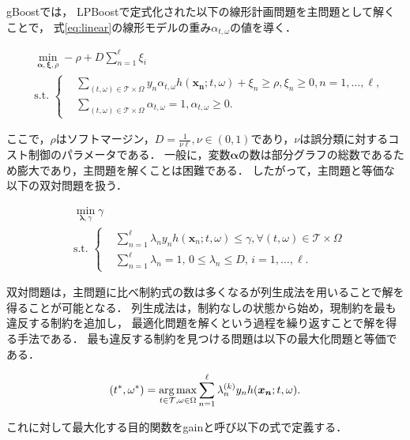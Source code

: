 gBoostでは，
LPBoostで定式化された以下の線形計画問題を主問題として解くことで，
式\eqref{eq:linear}の線形モデルの重み$\alpha_{t,\omega}$の値を導く．

\begin{align}
	&\min_{\bm{\alpha},\bm{\xi},\rho} -\rho + D \sum_{n=1}^{\ell} \xi_{i} \nonumber\\
	&\text{s.t.} \,\,\left\{
	\begin{aligned}
		&\sum_{(t,\omega) \in \mathcal{T} \times \Omega} y_{n} \alpha_{t,\omega} h(\bm{x_{n}};t,\omega) + \xi_{n} \geq \rho,
		\xi_{n} \geq 0,	n = 1, \dots , \ell,\nonumber \\
		&\sum_{(t,\omega) \in \mathcal{T} \times \Omega} \alpha_{t, \omega} = 1, \alpha_{t, \omega} \geq 0.
	\end{aligned}\right.
\end{align}

ここで，$\rho$はソフトマージン，$D=\frac{1}{\nu \ell}, \nu \in (0,1)$であり，$\nu$は誤分類に対するコスト制御のパラメータである．
一般に，変数$\bm{\alpha}$の数は部分グラフの総数であるため膨大であり，主問題を解くことは困難である．
したがって，主問題と等価な以下の双対問題を扱う．

\begin{align}
	\label{eq:dualprob}
	&\min_{\bm{\lambda},\gamma} \gamma \nonumber\\
	&\text{s.t.} \,\,\left\{
	\begin{aligned}
		& \sum_{n=1}^{\ell} \lambda_{n} y_{n} h(\bm{x}_{n};t,\omega) \leq \gamma,
		\forall(t,\omega) \in \mathcal{T} \times \Omega\\
		& \sum_{n=1}^{\ell} \lambda_{n} = 1, \,0 \leq \lambda_{n} \leq D, \,i = 1, \dots , \ell. 
	\end{aligned}\right. \end{align}

双対問題は，主問題に比べ制約式の数は多くなるが列生成法を用いることで解を得ることが可能となる．
列生成法は，制約なしの状態から始め，現制約を最も違反する制約を追加し，
最適化問題を解くという過程を繰り返すことで解を得る手法である．
最も違反する制約を見つける問題は以下の最大化問題と等価である．

\begin{equation*}
	(t^{*}, \omega^{*}) = \operatorname*{arg\,max}_{t \in \mathcal{T} , \omega \in \Omega} \sum_{n=1}^{\ell} \lambda_{n}^{(k)} y_{n} h(\bm{x_{n}} ; t, \omega).
\end{equation*}

これに対して最大化する目的関数をgainと呼び以下の式で定義する．

